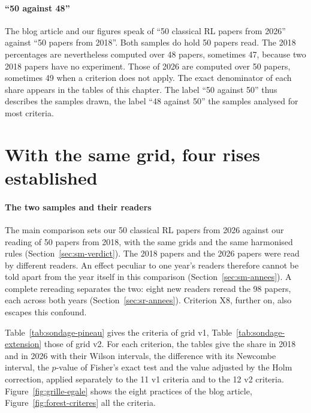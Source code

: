 \paragraph{\enquote{50 against 48}}
The blog article and our figures speak of \enquote{50 classical RL papers from 2026} against
\enquote{50 papers from 2018}. Both samples do hold 50 papers read. The 2018 percentages are
nevertheless computed over 48 papers, sometimes 47, because two 2018 papers have no experiment. Those of
2026 are computed over 50 papers, sometimes 49 when a criterion does not apply. The exact denominator of
each share appears in the tables of this chapter. The label \enquote{50 against 50} thus describes the
samples drawn, the label \enquote{48 against 50} the samples analysed for most criteria.

\section{With the same grid, four rises established}\label{sec:sr-principale}

\paragraph{The two samples and their readers}
The main comparison sets our 50 classical RL papers from 2026 against our reading of 50 papers from
2018, with the same grids and the same harmonised rules (Section~\ref{sec:sm-verdict}). The 2018 papers
and the 2026 papers were read by different readers. An effect peculiar to one year's readers therefore
cannot be told apart from the year itself in this comparison (Section~\ref{sec:sm-annees}). A
complete rereading separates the two: eight new readers reread the 98 papers, each across both years
(Section~\ref{sec:sr-annees}). Criterion X8, further on, also escapes this confound.

Table~\ref{tab:sondage-pineau} gives the criteria of grid v1, Table~\ref{tab:sondage-extension} those
of grid v2. For each criterion, the tables give the share in 2018 and in 2026 with their Wilson
intervals, the difference with its Newcombe interval, the $p$-value of Fisher's exact test and the value
adjusted by the Holm correction, applied separately to the 11 v1 criteria and to the 12 v2 criteria.
Figure~\ref{fig:grille-egale} shows the eight practices of the blog article,
Figure~\ref{fig:forest-criteres} all the criteria.


